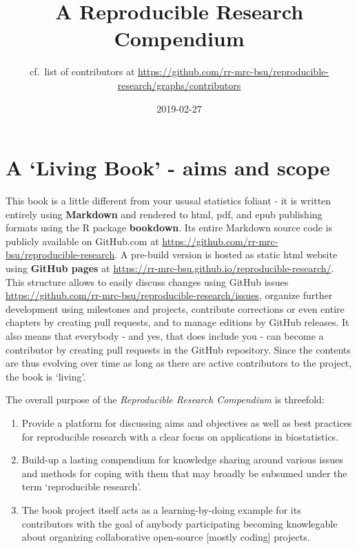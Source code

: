 \documentclass[]{book}
\title{A Reproducible Research Compendium}
\author{cf.~list of contributors at
\url{https://github.com/rr-mrc-bsu/reproducible-research/graphs/contributors}}
\date{2019-02-27}
\providecommand{\tightlist}{%
  \setlength{\itemsep}{0pt}\setlength{\parskip}{0pt}}
\begin{document}
\maketitle

{
\setcounter{tocdepth}{1}
\tableofcontents
}
\chapter{\texorpdfstring{A `Living Book' - aims and
scope}{A Living Book - aims and scope}}\label{a-living-book---aims-and-scope}

This book is a little different from your ususal statistics foliant - it
is written entirely using \textbf{Markdown} and rendered to html, pdf,
and epub publishing formats using the R package \textbf{bookdown}. Its
entire Markdown source code is publicly available on GitHub.com at
\url{https://github.com/rr-mrc-bsu/reproducible-research}. A pre-build
version is hosted as static html website using \textbf{GitHub pages} at
\url{https://rr-mrc-bsu.github.io/reproducible-research/}. This
structure allows to easily discuss changes using GitHub issues
\url{https://github.com/rr-mrc-bsu/reproducible-research/issues},
organize further development using milestones and projects, contribute
corrections or even entire chapters by creating pull requests, and to
manage editions by GitHub releases. It also means that everybody - and
yes, that does include you - can become a contributor by creating pull
requests in the GitHub repository. Since the contents are thus evolving
over time as long as there are active contributors to the project, the
book is `living'.

The overall purpose of the \emph{Reproducible Research Compendium} is
threefold:

\begin{enumerate}
\def\labelenumi{\arabic{enumi}.}
\tightlist
\item
  Provide a platform for discussing aims and objectives as well as best
  practices for reproducible research with a clear focus on applications
  in biostatistics.
\item
  Build-up a lasting compendium for knowledge sharing around various
  issues and methods for coping with them that may broadly be subsumed
  under the term `reproducible research'.
\item
  The book project itself acts as a learning-by-doing example for its
  contributors with the goal of anybody participating becoming
  knowlegable about organizing collaborative open-source {[}mostly
  coding{]} projects.
\end{enumerate}
\end{document}
